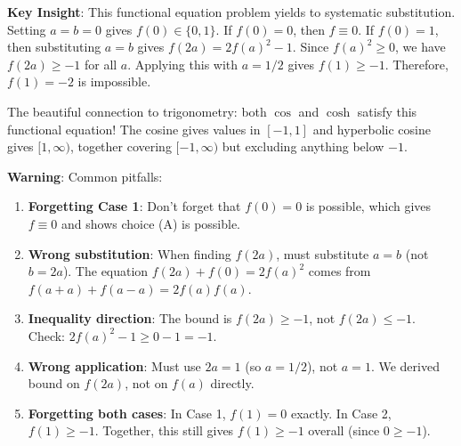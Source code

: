 \documentclass[12pt]{article}
\begin{document}
\begin{keyinsightbox}
\textbf{Key Insight}: This functional equation problem yields to systematic substitution. Setting $a = b = 0$ gives $f(0) \in \{0, 1\}$. If $f(0) = 0$, then $f \equiv 0$. If $f(0) = 1$, then substituting $a = b$ gives $f(2a) = 2f(a)^2 - 1$. Since $f(a)^2 \geq 0$, we have $f(2a) \geq -1$ for all $a$. Applying this with $a = 1/2$ gives $f(1) \geq -1$. Therefore, $f(1) = -2$ is impossible.

The beautiful connection to trigonometry: both $\cos$ and $\cosh$ satisfy this functional equation! The cosine gives values in $[-1, 1]$ and hyperbolic cosine gives $[1, \infty)$, together covering $[-1, \infty)$ but excluding anything below $-1$.
\end{keyinsightbox}

\begin{warningbox}
\textbf{Warning}: Common pitfalls:
\begin{enumerate}
    \item \textbf{Forgetting Case 1}: Don't forget that $f(0) = 0$ is possible, which gives $f \equiv 0$ and shows choice (A) is possible.
    \item \textbf{Wrong substitution}: When finding $f(2a)$, must substitute $a = b$ (not $b = 2a$). The equation $f(2a) + f(0) = 2f(a)^2$ comes from $f(a+a) + f(a-a) = 2f(a)f(a)$.
    \item \textbf{Inequality direction}: The bound is $f(2a) \geq -1$, not $f(2a) \leq -1$. Check: $2f(a)^2 - 1 \geq 0 - 1 = -1$.
    \item \textbf{Wrong application}: Must use $2a = 1$ (so $a = 1/2$), not $a = 1$. We derived bound on $f(2a)$, not on $f(a)$ directly.
    \item \textbf{Forgetting both cases}: In Case 1, $f(1) = 0$ exactly. In Case 2, $f(1) \geq -1$. Together, this still gives $f(1) \geq -1$ overall (since $0 \geq -1$).
\end{enumerate}
\end{warningbox}
\end{document}
